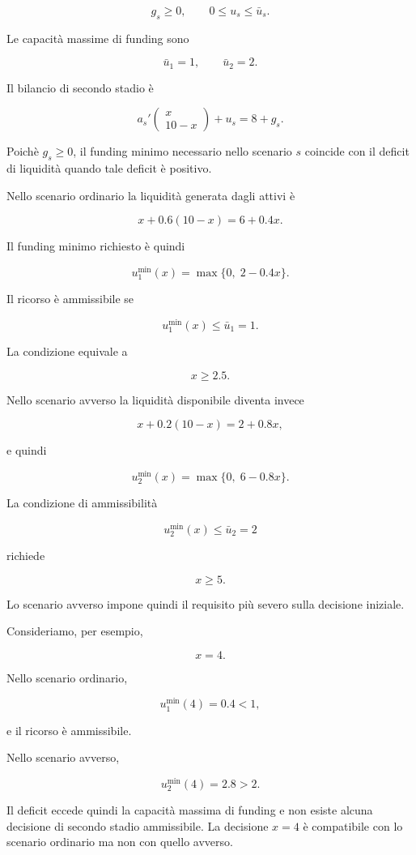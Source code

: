 \[
g_s\geq0,
\qquad
0\leq u_s\leq\bar u_s.
\]

Le capacit\`a massime di funding sono

\[
\bar u_1=1,
\qquad
\bar u_2=2.
\]

Il bilancio di secondo stadio \`e

\[
a_s'
\begin{pmatrix}
x\\
10-x
\end{pmatrix}
+
u_s
=
8+g_s.
\]

Poich\`e $g_s\geq0$, il funding minimo necessario nello scenario $s$ coincide
con il deficit di liquidit\`a quando tale deficit \`e positivo.

Nello scenario ordinario la liquidit\`a generata dagli attivi \`e

\[
x+0.6(10-x)
=
6+0.4x.
\]

Il funding minimo richiesto \`e quindi

\[
u_1^{\min}(x)
=
\max\{0,\;2-0.4x\}.
\]

Il ricorso \`e ammissibile se

\[
u_1^{\min}(x)
\leq
\bar u_1=1.
\]

La condizione equivale a

\[
x\geq2.5.
\]

Nello scenario avverso la liquidit\`a disponibile diventa invece

\[
x+0.2(10-x)
=
2+0.8x,
\]

e quindi

\[
u_2^{\min}(x)
=
\max\{0,\;6-0.8x\}.
\]

La condizione di ammissibilit\`a

\[
u_2^{\min}(x)
\leq
\bar u_2=2
\]

richiede

\[
x\geq5.
\]

Lo scenario avverso impone quindi il requisito pi\`u severo sulla decisione
iniziale.

Consideriamo, per esempio,

\[
x=4.
\]

Nello scenario ordinario,

\[
u_1^{\min}(4)
=
0.4
<
1,
\]

e il ricorso \`e ammissibile.

Nello scenario avverso,

\[
u_2^{\min}(4)
=
2.8
>
2.
\]

Il deficit eccede quindi la capacit\`a massima di funding e non esiste alcuna
decisione di secondo stadio ammissibile. La decisione $x=4$ \`e compatibile
con lo scenario ordinario ma non con quello avverso.

